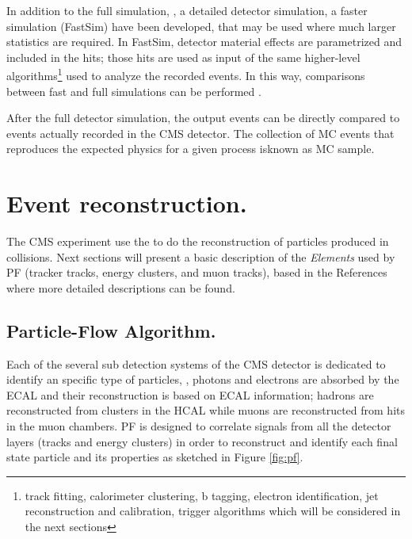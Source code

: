 In addition to the full simulation, \ie, a detailed detector simulation, a faster simulation (FastSim) have been developed, that may be used where much larger statistics are required. In FastSim, detector material effects are parametrized and included in the hits; those hits are used as input of the same higher-level algorithms\footnote{track fitting, calorimeter clustering, b tagging, electron identification, jet reconstruction and calibration, trigger algorithms which will be considered in the next sections} used to analyze the recorded events. In this way, comparisons between fast and full simulations can be performed \cite{fastsim}.

After the full detector simulation, the output events can be directly compared to events actually recorded in the CMS detector. The collection of MC events that reproduces the expected physics for a given process isknown as MC sample.

\section{Event reconstruction.}

The CMS experiment use the  to do the reconstruction of particles produced in \pp collisions. Next sections will present a basic description of the \textit{Elements} used by PF (tracker tracks, energy clusters, and muon tracks), based in the References \cite{particle_flow, particle_flow2} where more detailed descriptions can be found.  

\subsection{Particle-Flow Algorithm.}\label{subsec:particle_flow}

Each of the several sub detection systems of the CMS detector is dedicated to identify an specific type of particles, \ie, photons and electrons are absorbed by the ECAL and their reconstruction is based on ECAL information; hadrons are reconstructed from clusters in the HCAL while muons are reconstructed from hits in the muon chambers. PF is designed to correlate signals from all the detector layers (tracks and energy clusters) in order to reconstruct and identify each final state particle and its properties as sketched in Figure \ref{fig:pf}.

